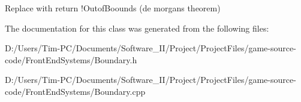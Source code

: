 Replace with return !\+Outof\+Boounds (de morgans theorem) 

The documentation for this class was generated from the following files\+:\begin{DoxyCompactItemize}
\item 
D\+:/\+Users/\+Tim-\/\+P\+C/\+Documents/\+Software\+\_\+\+I\+I/\+Project/\+Project\+Files/game-\/source-\/code/\+Front\+End\+Systems/Boundary.\+h\item 
D\+:/\+Users/\+Tim-\/\+P\+C/\+Documents/\+Software\+\_\+\+I\+I/\+Project/\+Project\+Files/game-\/source-\/code/\+Front\+End\+Systems/Boundary.\+cpp\end{DoxyCompactItemize}
